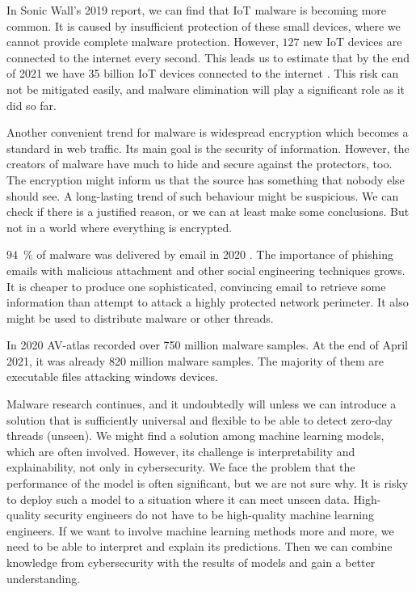 In Sonic Wall's 2019 report, we can find that IoT malware is becoming more common. It is caused by insufficient protection of these small devices, where we cannot provide complete malware protection. However, $127$ new IoT devices are connected to the internet every second. This leads us to estimate that by the end of 2021 we have 35 billion IoT devices connected to the internet \cite{TheIoTRu52:online}. This risk can not be mitigated easily, and malware elimination will play a significant role as it did so far.

Another convenient trend for malware is widespread encryption which becomes a standard in web traffic. Its main goal is the security of information. However, the creators of malware have much to hide and secure against the protectors, too. The encryption might inform us that the source has something that nobody else should see. A long-lasting trend of such behaviour might be suspicious. We can check if there is a justified reason, or we can at least make some conclusions. But not in a world where everything is encrypted.

$94$~\% of malware was delivered by email in 2020 \cite{Topcyber13:online}. The importance of phishing emails with malicious attachment and other social engineering techniques grows. It is cheaper to produce one sophisticated, convincing email to retrieve some information than attempt to attack a highly protected network perimeter. It also might be used to distribute malware or other threads.

In 2020 AV-atlas \cite{AVATLASM39:online} recorded over 750 million malware samples. At the end of April 2021, it was already 820 million malware samples. The majority of them are executable files attacking windows devices.

Malware research continues, and it undoubtedly will unless we can introduce a solution that is sufficiently universal and flexible to be able to detect zero-day threads (unseen). We might find a solution among machine learning models, which are often involved. However, its challenge is interpretability and explainability, not only in cybersecurity. We face the problem that the performance of the model is often significant, but we are not sure why. It is risky to deploy such a model to a situation where it can meet unseen data. High-quality security engineers do not have to be high-quality machine learning engineers. If we want to involve machine learning methods more and more, we need to be able to interpret and explain its predictions. Then we can combine knowledge from cybersecurity with the results of models and gain a better understanding. 


